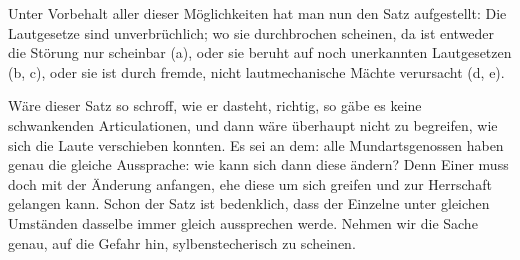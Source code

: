 {\label{III.II.II.2axiom}Unter Vorbehalt aller dieser Möglichkeiten hat man nun den Satz aufgestellt: Die Lautgesetze sind unverbrüchlich; wo sie durchbrochen scheinen, da ist entweder die Störung nur scheinbar (a), oder sie beruht auf noch unerkannten Lautgesetzen (b, c), oder sie ist durch fremde, nicht lautmechanische Mächte verursacht (d, e).

Wäre dieser Satz so schroff, wie er dasteht, richtig, so gäbe es keine \label{sp.187} schwankenden Articulationen, und dann wäre überhaupt nicht zu begreifen, wie sich die Laute verschieben konnten. Es sei an dem: alle Mundartsgenossen haben genau die gleiche Aussprache: wie kann sich dann diese ändern? Denn Einer muss doch mit der Änderung anfangen, ehe diese um sich greifen und zur Herrschaft gelangen kann. Schon der Satz ist bedenklich, dass der Einzelne unter gleichen Umständen dasselbe immer gleich aussprechen werde. Nehmen wir die Sache genau, auf die Gefahr hin, sylbenstecherisch zu scheinen.

}
